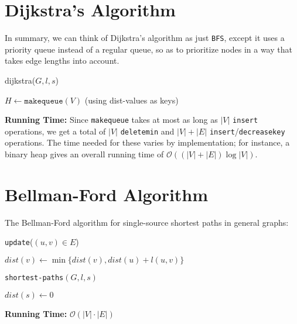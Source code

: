 \documentclass[11pt]{article}
\begin{document}
	\section*{Dijkstra's Algorithm}
	In summary, we can think of Dijkstra's algorithm as just \texttt{BFS}, except it uses a priority queue instead of a regular queue, so as to prioritize nodes in a way that takes edge lengths into account.
	\begin{algorithm}[H]
		\caption{dijkstra($G, l, s$)}
		
		$H \leftarrow \texttt{makequeue}(V)$ (using dist-values as keys)\\
	\end{algorithm}
	\textbf{Running Time:} Since \texttt{makequeue} takes at most as long as $|V|$ \texttt{insert} operations, we get a total of $|V|$ \texttt{deletemin} and $|V| + |E|$ \texttt{insert}/\texttt{decreasekey} operations. The time needed for these varies by implementation; for instance, a binary heap gives an overall running time of $\mathcal{O}((|V| + |E|)\log |V|)$.

	\vspace*{0.7cm}
	
	\section*{Bellman-Ford Algorithm}
	The Bellman-Ford algorithm for single-source shortest paths in general graphs:\\
	\begin{algorithm}[H]
		\caption{\texttt{update}($(u, v) \in E$)}
		$dist(v) \leftarrow \min\{dist(v), dist(u) + l(u, v)\}$
	\end{algorithm}

	\begin{algorithm}[H]
		\caption{\texttt{shortest-paths}$(G, l, s)$}
		$dist(s) \leftarrow 0$\\
	\end{algorithm}
	\textbf{Running Time:} $\mathcal{O}(|V| \cdot |E|)$
	
\end{document}
